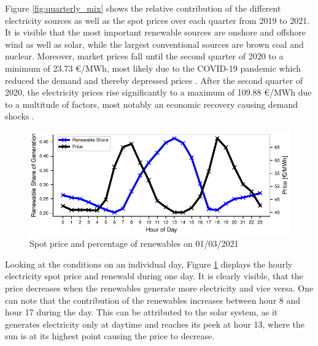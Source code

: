 \documentclass{article}
\begin{document}
Figure \ref{fig:quarterly_mix} shows the relative contribution of the different electricity sources as well as the spot prices over each quarter from 2019 to 2021.
It is visible that the most important renewable sources are onshore and offshore wind as well as solar, while the largest conventional sources are brown coal and nuclear.
Moreover, market prices fall until the second quarter of 2020 to a minimum of 23.73 €/MWh, most likely due to the COVID-19 pandemic which reduced the demand and thereby depressed prices \citep{covid_electricity_systems}.
After the second quarter of 2020, the electricity prices rise significantly to a maximum of 109.88 €/MWh due to a multitude of factors, most notably an economic recovery causing demand shocks \citep{long_covid_energy_prices}.




\begin{figure}[h]
    \centering
    \includegraphics[width=\columnwidth]{doc/fig/example_day.pdf}
    \caption{Spot price and percentage of renewables on 01/03/2021}
    \label{fig:example_day}
\end{figure}

Looking at the conditions on an individual day, Figure \ref{fig:example_day} displays the hourly electricity spot price and renewabl during one day. 
It is clearly visible, that the price decreases when the renewables generate more electricity and vice versa. 
One can note that the contribution of the renewables increases between hour 8 and hour 17 during the day. 
This can be attributed to the solar system, as it generates electricity only at daytime and reaches its peek at hour 13, where the sun is at its highest point causing the price to decrease. 
\end{document}
